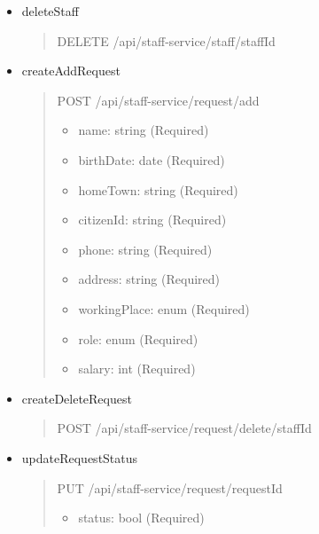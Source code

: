 \begin{itemize}
	\item deleteStaff
	\begin{quote}
		DELETE /api/staff-service/staff/{staffId}
	\end{quote}

	\item createAddRequest
	\begin{quote}
		POST /api/staff-service/request/add
		\begin{itemize}
			\item name: string (Required)
			\item birthDate: date (Required)
			\item homeTown: string (Required)
			\item citizenId: string (Required)
			\item phone: string (Required)
			\item address: string (Required)
			\item workingPlace: enum (Required)
			\item role: enum (Required)
			\item salary: int (Required)
		\end{itemize}
	\end{quote}

	\item createDeleteRequest
	\begin{quote}
		POST /api/staff-service/request/delete/{staffId}
	\end{quote}

	\item updateRequestStatus
	\begin{quote}
		PUT /api/staff-service/request/{requestId}
		\begin{itemize}
			\item status: bool (Required)
		\end{itemize}
	\end{quote}

\end{itemize}


